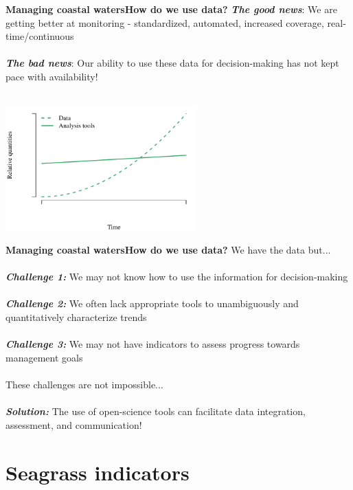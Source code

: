\documentclass[serif]{beamer}\usepackage[]{graphicx}\usepackage[]{color}
\newcommand{\emtxt}[1]{\textbf{\textit{#1}}}
\begin{document}
\begin{frame}{\textbf{Managing coastal waters}}{\textbf{How do we use data?}}
\emtxt{The good news}: We are getting better at monitoring - standardized, automated, increased coverage, real-time/continuous \\~\\
\emtxt{The bad news}: Our ability to use these data for decision-making has not kept pace with availability! \\~\\


{\centering \includegraphics[width=0.55\textwidth]{fig/theo} 

}



\end{frame}

\begin{frame}{\textbf{Managing coastal waters}}{\textbf{How do we use data?}}
\onslide<+->
We have the data but... \\~\\
\emtxt{Challenge 1:} We may not know how to use the information for decision-making \\~\\
\emtxt{Challenge 2:} We often lack appropriate tools to unambiguously and quantitatively characterize trends \\~\\
\emtxt{Challenge 3:} We may not have indicators to assess progress towards management goals \\~\\
\onslide<+->
These challenges are not impossible... \scriptsize \cite{Kelling09} \\~\\
\normalsize
\emtxt{Solution:} The use of open-science tools can facilitate data integration, assessment, and communication!
\end{frame}

\section{Seagrass indicators}
\end{document}
